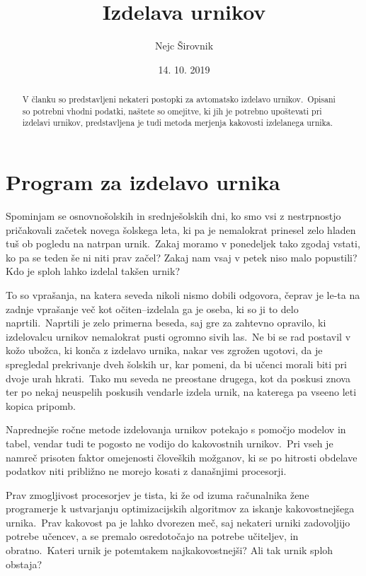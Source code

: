 \documentclass[a4paper,10pt]{article}
\begin{document}
\title{Izdelava urnikov}
\author{Nejc Širovnik}
\date{14. 10. 2019}

\maketitle

\begin{abstract}
V članku so predstavljeni nekateri postopki za avtomatsko izdelavo urnikov.\ Opisani so
potrebni vhodni podatki, naštete so omejitve, ki jih je potrebno upoštevati pri izdelavi
urnikov, predstavljena je tudi metoda merjenja kakovosti izdelanega urnika.
\end{abstract}

\section{Program za izdelavo urnika}

Spominjam se osnovnošolskih in srednješolskih dni, ko smo vsi z nestrpnostjo pričakovali
začetek novega šolskega leta, ki pa je nemalokrat prinesel zelo hladen tuš ob pogledu na
natrpan urnik.\ Zakaj moramo v ponedeljek tako zgodaj vstati, ko pa se teden še ni niti
prav začel? Zakaj nam vsaj v petek niso malo popustili? Kdo je sploh lahko izdelal
takšen urnik?

To so vprašanja, na katera seveda nikoli nismo dobili odgovora, čeprav je le-ta na zadnje
vprašanje več kot očiten--izdelala ga je oseba, ki so ji to delo naprtili.\ Naprtili je
zelo primerna beseda, saj gre za zahtevno opravilo, ki izdelovalcu urnikov nemalokrat
pusti ogromno sivih las.\ Ne bi se rad postavil v kožo ubožca, ki konča z izdelavo urnika,
nakar ves zgrožen ugotovi, da je spregledal prekrivanje dveh šolskih ur, kar pomeni, da
bi učenci morali biti pri dvoje urah hkrati.\ Tako mu seveda ne preostane drugega, kot da
poskusi znova ter po nekaj neuspelih poskusih vendarle izdela urnik, na katerega pa vseeno
leti kopica pripomb.

Naprednejše ročne metode izdelovanja urnikov potekajo s pomočjo modelov in tabel, vendar
tudi te pogosto ne vodijo do kakovostnih urnikov.\ Pri vseh je namreč prisoten faktor
omejenosti človeških možganov, ki se po hitrosti obdelave podatkov niti približno ne
morejo kosati z današnjimi procesorji.

Prav zmogljivost procesorjev je tista, ki že od izuma računalnika žene programerje k
ustvarjanju optimizacijskih algoritmov za iskanje kakovostnejšega urnika.\ Prav kakovost
pa je lahko dvorezen meč, saj nekateri urniki zadovoljijo potrebe učencev, a se premalo
osredotočajo na potrebe učiteljev, in obratno.\ Kateri urnik je potemtakem najkakovostnejši?
Ali tak urnik sploh obstaja?
\end{document}
